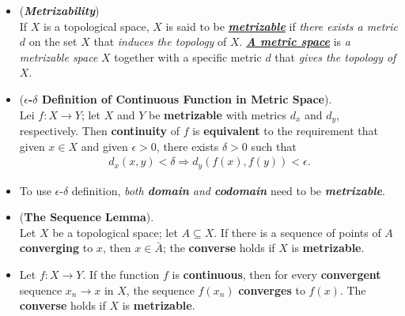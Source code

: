 \documentclass[11pt]{article}
\begin{document}
\begin{itemize}
\item \begin{definition} (\textbf{\emph{Metrizability}})\\
If $X$ is a topological space, $X$ is said to be \underline{\emph{\textbf{metrizable}}} if \emph{there exists a metric} $d$ on the set $X$ that \emph{induces the topology} of $X$. \underline{\emph{\textbf{A metric space}}} is \emph{a metrizable space} $X$ together with a specific metric $d$ that \emph{gives the topology of $X$}.
\end{definition}


\item \begin{theorem} (\textbf{$\epsilon$-$\delta$ Definition of Continuous Function in Metric Space}). \citep{munkres2000topology} \\
Lei $f: X \rightarrow Y$; let $X$ and $Y$ be \textbf{metrizable} with metrics $d_x$ and $d_y$, respectively. Then \textbf{continuity} of $f$ is \textbf{equivalent} to the requirement that given $x \in X$ and given $\epsilon > 0$, there exists $\delta > 0$ such that
\begin{align*}
d_x(x, y) < \delta \Rightarrow d_{y}(f(x), f(y)) < \epsilon.
\end{align*}
\end{theorem}

\item \begin{remark}
To use $\epsilon$-$\delta$ definition, \emph{both \textbf{domain} and \textbf{codomain}} need to be \emph{\textbf{metrizable}}.
\end{remark}

\item \begin{lemma}(\textbf{The Sequence Lemma}). \citep{munkres2000topology}\\
Let $X$ be a topological space; let $A \subseteq X$. If there is a sequence of points of $A$ \textbf{converging} to $x$, then $x \in \bar{A}$; the \textbf{converse} holds if $X$ is \textbf{metrizable}.
\end{lemma}

\item \begin{proposition}
Let $f: X \rightarrow Y$. If the function $f$ is \textbf{continuous}, then for every \textbf{convergent} sequence $x_n \rightarrow x$ in $X$, the sequence $f(x_n)$ \textbf{converges} to $f(x)$. The \textbf{converse} holds if $X$ is \textbf{metrizable}.
\end{proposition}


\end{itemize}
\end{document}
